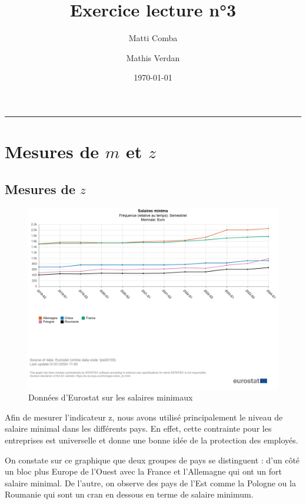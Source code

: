 \documentclass{article}
\title{\Huge \textbf{Exercice lecture n°3}}
\author{Matti Comba \and Mathis Verdan}
\date{\today}
\begin{document}
\maketitle
\begin{center}
  \rule{\linewidth}{0.5mm}
\end{center}


\section{Mesures de $m$ et $z$}

\subsection{Mesures de $z$}

\begin{figure}[H]
  \centering
  \begin{minipage}{0.8\textwidth}
      \centering
      \includegraphics[width=\textwidth]{"smic.png"}
      \caption{Données d'Eurostat sur les salaires minimaux}
  \end{minipage}
\end{figure}
\vspace{0.5cm}

Afin de mesurer l'indicateur z, nous avons utilisé principalement le niveau de salaire minimal dans les différents pays. En effet, cette contrainte pour les entreprises est universelle et donne une bonne idée de la protection des employés.

On constate sur ce graphique que deux groupes de pays se distinguent : d'un côté un bloc plus Europe de l'Ouest avec la France et l'Allemagne qui ont un fort salaire minimal. De l'autre, on observe des pays de l'Est comme la Pologne ou la Roumanie qui sont un cran en dessous en terme de salaire minimum.
\end{document}
